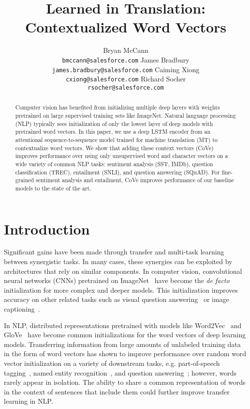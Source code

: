\documentclass{article}
\title{Learned in Translation: Contextualized Word Vectors}
\author{
Bryan McCann \\
  \texttt{bmccann@salesforce.com}
  \And James Bradbury  \\
  \texttt{james.bradbury@salesforce.com}
  \And Caiming Xiong \\
  \texttt{cxiong@salesforce.com} 
  \And Richard Socher \\
  \texttt{rsocher@salesforce.com}
}
\begin{document}
\maketitle

\begin{abstract}
Computer vision has benefited from initializing multiple deep layers with weights pretrained on large supervised training sets like ImageNet.
Natural language processing (NLP) 
typically sees initialization of only the lowest layer of deep models with pretrained word vectors. 
In this paper, 
we use a deep LSTM encoder from an attentional sequence-to-sequence model trained for machine translation (MT) to contextualize word vectors.
We show that adding these context vectors (CoVe) improves performance over using only unsupervised word and character vectors on a wide variety of common NLP tasks: 
sentiment analysis (SST, IMDb), 
question classification (TREC), 
entailment (SNLI), 
and question answering (SQuAD). 
For fine-grained sentiment analysis and entailment,
CoVe improves performance of our baseline models to the state of the art.
\end{abstract} \section{Introduction}

Significant gains have been made through transfer and multi-task learning between synergistic tasks.
In many cases, these synergies can be exploited by architectures that rely on similar components. 
In computer vision, convolutional neural networks (CNNs) pretrained on ImageNet~\citep{krizhevsky2012imagenet, Deng2009ImageNetAL} have become the \textit{de facto} initialization for more complex and deeper models. 
This initialization improves accuracy on other related tasks such as visual question answering~\citep{xiong2016dynamic} or image captioning~\citep{lu2016knowing, Socher2014TACL}.

In NLP, distributed representations pretrained with models like Word2Vec~\citep{Mikolov2013b} and GloVe~\citep{Pennington2014} have become common initializations for the word vectors of deep learning models. 
Transferring information from large amounts of unlabeled training data in the form of word vectors has shown to improve performance over random word vector initialization on a variety of downstream tasks, 
e.g. part-of-speech tagging~\citep{Collobert2011}, named entity recognition~\citep{Pennington2014}, and question answering~\citep{Xiong2017};
however, words rarely appear in isolation.
The ability to share a common representation of words in the context of sentences that include them could further improve transfer learning in NLP.
\end{document}

